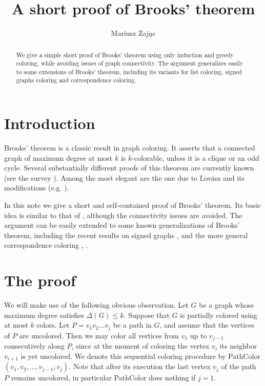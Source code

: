 \documentclass[12pt]{amsart}
\theoremstyle{plain}
\numberwithin{equation}{section}
\begin{document}
\title[Brooks' theorem]{A short proof of Brooks' theorem}

\author{Mariusz Zaj\k{a}c}
\address{Faculty of Mathematics and Information Science, Warsaw University
	of Technology, Koszykowa 75, 00-662 Warsaw, Poland}


\begin{abstract}
We give a simple short proof of Brooks' theorem using only induction and greedy coloring, while avoiding issues of graph connectivity. The argument generalizes easily to some extensions of Brooks' theorem, including its variants for list coloring, signed graphs coloring and correspondence coloring.
\end{abstract}

\maketitle

\section{Introduction}
Brooks' theorem \cite{Brooks} is a classic result in graph coloring. It asserts that a connected graph of maximum degree at most $k$ is $k$-colorable, unless it is a clique or an odd cycle. Several substantially different proofs of this theorem are currently known (see the survey \cite{CranstonRabern}). Among the most elegant are the one due to Lov\'{a}sz \cite{Lovasz} and its modifications (e.g. \cite{Bondy}).

In this note we give a short and self-contained proof of Brooks' theorem. Its basic idea is similar to that of \cite{Lovasz}, although the connectivity issues are avoided. The argument can be easily extended to some known generalizations of Brooks' theorem, including the recent results on signed graphs \cite{MacajovaRS}, \cite{Stiebitz} and the more general correspondence coloring \cite{BernshteynKP}, \cite{DvorakPostle}.

\section{The proof}

We will make use of the following obvious observation. Let $G$ be a graph whose maximum degree satisfies $\Delta (G)\leq k$. Suppose that $G$ is partially colored using at most $k$ colors. Let $P=v_1v_2\dots v_j$ be a path in $G$, and assume that the vertices of $P$ are uncolored. Then we may color all vertices from $v_1$ up to $v_{j-1}$ consecutively along $P$, since at the moment of coloring the vertex $v_i$ its neighbor $v_{i+1}$ is yet uncolored. We denote this sequential coloring procedure by {\sc PathColor}$(v_1,v_2,\dots,v_{j-1};v_j)$. Note that after its execution the last vertex $v_j$ of the path $P$ remains uncolored, in particular {\sc PathColor} does nothing if $j=1$.
\end{document}
